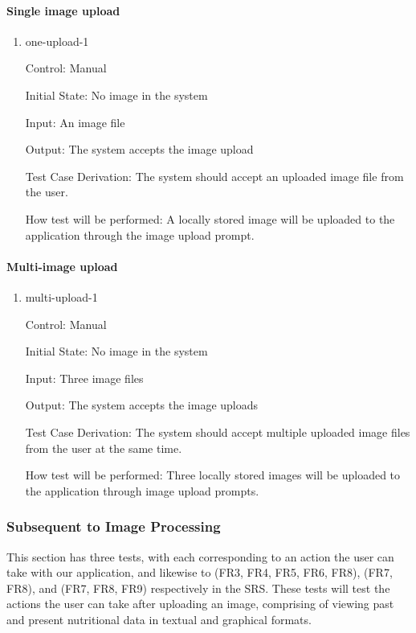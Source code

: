 \documentclass[12pt, titlepage]{article}
\begin{document}
	\paragraph{Single image upload}
	
	\begin{enumerate}
		
		\item{one-upload-1\\}
		
		Control: Manual
		
		Initial State: No image in the system
		
		Input: An image file
		
		Output: The system accepts the image upload
		
		Test Case Derivation: The system should accept an uploaded image file from the user.
		
		How test will be performed: A locally stored image will be uploaded to the application through the image upload prompt. 
		
	\end{enumerate}
	
	\paragraph{Multi-image upload}
	
	\begin{enumerate}
		
		\item{multi-upload-1\\}
		
		Control: Manual
		
		Initial State: No image in the system
		
		Input: Three image files
		
		Output: The system accepts the image uploads
		
		Test Case Derivation: The system should accept multiple uploaded image files from the user at the same time.
		
		How test will be performed: Three locally stored images will be uploaded to the application through image upload prompts. 
		
	\end{enumerate}
	
	\subsubsection{Subsequent to Image Processing}
	This section has three tests, with each corresponding to an action the user can take with our application, and likewise to (FR3, FR4, FR5, FR6, FR8), (FR7, FR8), and (FR7, FR8, FR9) respectively in the SRS. These tests will test the actions the user can take after uploading an image, comprising of viewing past and present nutritional data in textual and graphical formats.
	
\end{document}
